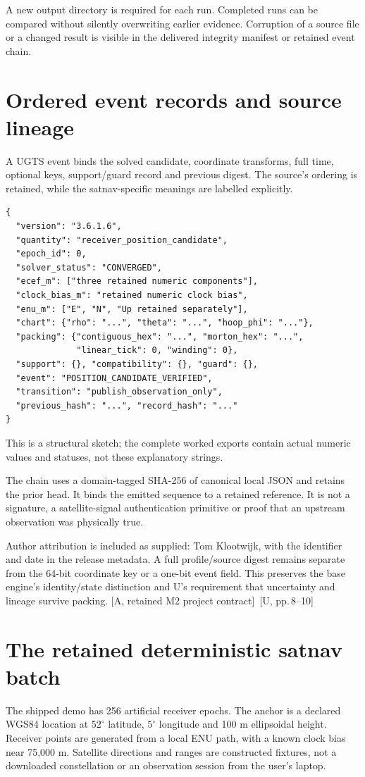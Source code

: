 \documentclass[11pt,a4paper]{article}
\newcommand{\src}[1]{\textcolor{muted}{[U, #1]}}
\newcommand{\base}{\textcolor{muted}{[A, retained M2 project contract]}}
\begin{document}
A new output directory is required for each run. Completed runs can be compared
without silently overwriting earlier evidence. Corruption of a source file or a
changed result is visible in the delivered integrity manifest or retained event chain.
\clearpage

\section{Ordered event records and source lineage}
A UGTS event binds the solved candidate, coordinate transforms, full time, optional
keys, support/guard record and previous digest. The source's ordering is retained,
while the satnav-specific meanings are labelled explicitly.

\begin{lstlisting}
{
  "version": "3.6.1.6",
  "quantity": "receiver_position_candidate",
  "epoch_id": 0,
  "solver_status": "CONVERGED",
  "ecef_m": ["three retained numeric components"],
  "clock_bias_m": "retained numeric clock bias",
  "enu_m": ["E", "N", "Up retained separately"],
  "chart": {"rho": "...", "theta": "...", "hoop_phi": "..."},
  "packing": {"contiguous_hex": "...", "morton_hex": "...",
              "linear_tick": 0, "winding": 0},
  "support": {}, "compatibility": {}, "guard": {},
  "event": "POSITION_CANDIDATE_VERIFIED",
  "transition": "publish_observation_only",
  "previous_hash": "...", "record_hash": "..."
}
\end{lstlisting}
This is a structural sketch; the complete worked exports contain actual numeric
values and statuses, not these explanatory strings.

The chain uses a domain-tagged SHA-256 of canonical local JSON and retains the prior
head. It binds the emitted sequence to a retained reference. It is not a signature,
a satellite-signal authentication primitive or proof that an upstream observation
was physically true.

Author attribution is included as supplied: Tom Klootwijk, with the identifier and
date in the release metadata. A full profile/source digest remains separate from the
64-bit coordinate key or a one-bit event field. This preserves the base engine's
identity/state distinction and U's requirement that uncertainty and lineage survive
packing. \base\ \src{pp.\,8--10}
\clearpage

\section{The retained deterministic satnav batch}
The shipped demo has 256 artificial receiver epochs. The anchor is a declared WGS84
location at $52^\circ$ latitude, $5^\circ$ longitude and 100 m ellipsoidal height.
Receiver points are generated from a local ENU path, with a known clock bias near
75,000 m. Satellite directions and ranges are constructed fixtures, not a downloaded
constellation or an observation session from the user's laptop.
\end{document}
